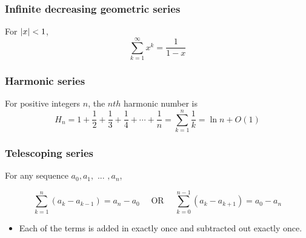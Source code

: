     \subsubsection{Infinite decreasing geometric series}
        \begin{definition}
            For $\abs{x} < 1$, 
            \begin{equation}
                \sum_{k=1}^{\infty} x^k = \frac{1}{1-x}
            \end{equation}
        \end{definition}

    \subsubsection{Harmonic series}
        \begin{definition}
            For positive integers $n$, the $nth$ harmonic number is
            \begin{equation}
                H_n = 1 + \frac{1}{2} + \frac{1}{3} + \frac{1}{4} + \cdots + \frac{1}{n} = \sum_{k=1}^{n} \frac{1}{k} = \ln n + O(1)
            \end{equation}                
        \end{definition}

    \subsubsection{Telescoping series}
        \begin{definition}
            For any sequence $a_0, a_1, \text{ ... }, a_n$,

            \begin{equation}
                \sum_{k=1}^{n} (a_k - a_{k-1}) = a_n - a_0 \quad \text{ OR } \quad \sum_{k=0}^{n-1} (a_k - a_{k+1}) = a_0 - a_n
            \end{equation}

            \begin{itemize}
                \item Each of the terms is added in exactly once and subtracted out exactly once.
            \end{itemize}

        \end{definition}

